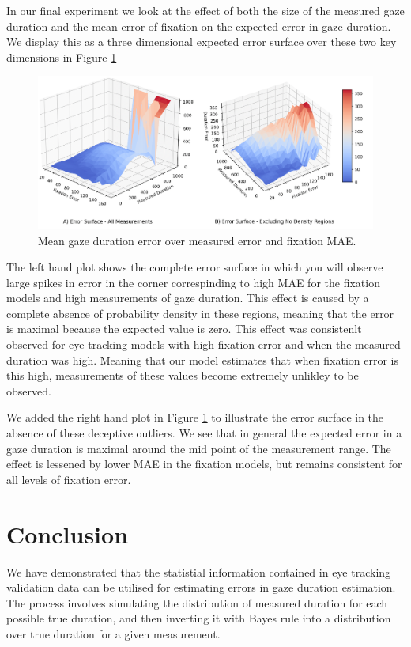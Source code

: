 \documentclass[12pt,a4paper]{article}
\numberwithin{equation}{section}
\begin{document}
In our final experiment we look at the effect of both the size of the measured 
gaze duration and the mean error of fixation on the expected error in gaze duration.
We display this as a three dimensional expected error surface over these two key dimensions
in Figure \ref{fig:error_surface}

\begin{figure}[h!]
\centering
\includegraphics[scale=0.4]{../results/Error_surface.png}
\caption{Mean gaze duration error over measured error and fixation MAE.}
\label{fig:error_surface}
\end{figure}

The left hand plot shows the complete error surface in which you will observe large spikes in
error in the corner correspinding to high MAE for the fixation models and high measurements of
gaze duration. This effect is caused by a complete absence of probability density in these
regions, meaning that the error is maximal because the expected value is zero. This effect 
was consistenlt observed for 
eye tracking models with high fixation error and when the measured duration was high. Meaning
that our model estimates that when fixation error is this high, measurements of these values
become extremely unlikley to be observed.

We added the right hand plot in Figure \ref{fig:error_surface} to illustrate the error surface
in the absence of these deceptive outliers. We see that in general the expected error in a gaze
duration is maximal around the mid point of the measurement range. The effect is lessened by 
lower MAE in the fixation models, but remains consistent for all levels of fixation error.


\section{Conclusion}

We have demonstrated that the statistial information contained in eye tracking validation
data can be utilised for estimating errors in gaze duration estimation. The process involves
simulating the distribution of measured duration for each possible true duration, 
and then inverting it with Bayes rule into a distribution over true duration for a given measurement.
\end{document}
